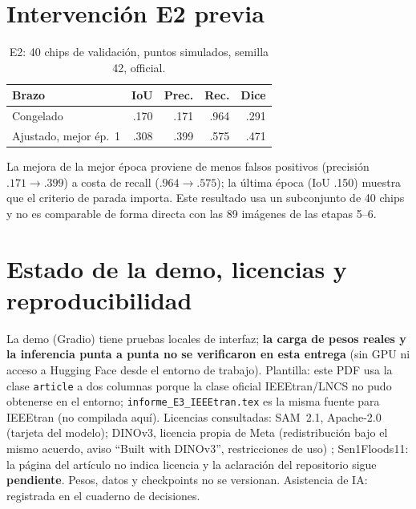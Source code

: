 \documentclass[11pt,twocolumn,a4paper]{article}
\begin{document}
\section{Intervenci\'on E2 previa}
\begin{table}[h]\centering\footnotesize\caption{E2: 40 chips de validaci\'on, puntos simulados, semilla 42, official.}
\begin{tabular}{@{}lrrrr@{}}\toprule
Brazo & IoU & Prec. & Rec. & Dice\\\midrule
Congelado & .170 & .171 & .964 & .291\\
Ajustado, mejor \'ep.~1 & .308 & .399 & .575 & .471\\\bottomrule
\end{tabular}\end{table}
La mejora de la mejor \'epoca proviene de menos falsos positivos (precisi\'on $.171\to.399$) a costa de recall ($.964\to.575$); la \'ultima \'epoca (IoU .150) muestra que el criterio de parada importa. Este resultado usa un subconjunto de 40 chips y no es comparable de forma directa con las 89 im\'agenes de las etapas 5--6.

\section{Estado de la demo, licencias y reproducibilidad}
La demo (Gradio) tiene pruebas locales de interfaz; \textbf{la carga de pesos reales y la inferencia punta a punta no se verificaron en esta entrega} (sin GPU ni acceso a Hugging Face desde el entorno de trabajo). Plantilla: este PDF usa la clase \texttt{article} a dos columnas porque la clase oficial IEEEtran/LNCS no pudo obtenerse en el entorno; \texttt{informe\_E3\_IEEEtran.tex} es la misma fuente para IEEEtran (no compilada aqu\'i). Licencias consultadas: SAM~2.1, Apache-2.0 (tarjeta del modelo); DINOv3, licencia propia de Meta (redistribuci\'on bajo el mismo acuerdo, aviso ``Built with DINOv3'', restricciones de uso) \cite{dinov3license}; Sen1Floods11: la p\'agina del art\'iculo no indica licencia y la aclaraci\'on del repositorio sigue \textbf{pendiente}. Pesos, datos y checkpoints no se versionan. Asistencia de IA: registrada en el cuaderno de decisiones.
\end{document}
